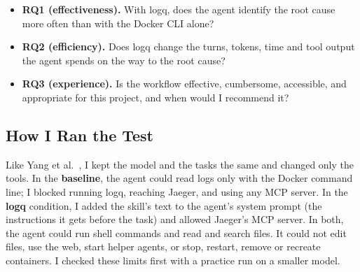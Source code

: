 \documentclass[10pt,conference]{IEEEtran}
\begin{document}
\begin{itemize}
\item \textbf{RQ1 (effectiveness).} With logq, does the agent identify the root cause more often than with the Docker CLI alone?
\item \textbf{RQ2 (efficiency).} Does logq change the turns, tokens, time and tool output the agent spends on the way to the root cause?
\item \textbf{RQ3 (experience).} Is the workflow effective, cumbersome, accessible, and appropriate for this project, and when would I recommend it?
\end{itemize}

\subsection{How I Ran the Test}

Like Yang et al.~\cite{yang2024sweagent}, I kept the model and the tasks the same and changed only the tools. In the \textbf{baseline}, the agent could read logs only with the Docker command line; I blocked running logq, reaching Jaeger, and using any MCP server. In the \textbf{logq} condition, I added the skill's text to the agent's system prompt (the instructions it gets before the task) and allowed Jaeger's MCP server. In both, the agent could run shell commands and read and search files. It could not edit files, use the web, start helper agents, or stop, restart, remove or recreate containers. I checked these limits first with a practice run on a smaller model.
\end{document}
